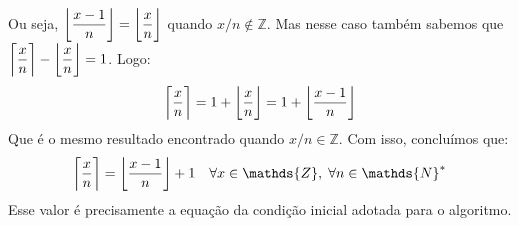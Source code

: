 Ou seja,
$\left\lfloor \dfrac{x - 1}{n} \right\rfloor =
 \left\lfloor \dfrac{x\vphantom{l}}{n} \right\rfloor$
quando $x/n \notin \mathds{Z}$.
Mas nesse caso também sabemos que
$\left\lceil \dfrac{x\vphantom{l}}{n} \right\rceil -
 \left\lfloor \dfrac{x\vphantom{l}}{n} \right\rfloor = 1$.
Logo:
\[
  \left\lceil \dfrac{x\vphantom{l}}{n} \right\rceil
  = 1 + \left\lfloor \dfrac{x\vphantom{l}}{n} \right\rfloor
  = 1 + \left\lfloor \dfrac{x - 1}{n} \right\rfloor
\]
Que é o mesmo resultado encontrado quando $x/n \in \mathds{Z}$.
Com isso, concluímos que:
\begin{equation}\label{ceil-x-over-n-as-floor}
  \left\lceil \dfrac{x\vphantom{l}}{n} \right\rceil
  = \left\lfloor \dfrac{x - 1}{n} \right\rfloor + 1
  \quad \forall x \in \mathds{Z}, \; \forall n \in \mathds{N}^*
\end{equation}
Esse valor é precisamente a equação da condição inicial
adotada para o algoritmo.
